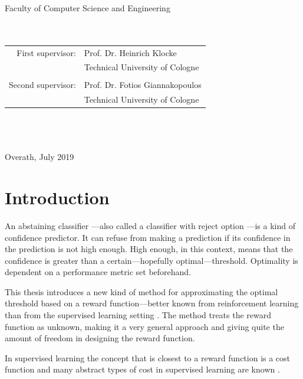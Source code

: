 \documentclass[twoside,11pt]{article}
\begin{document}
\begin{titlepage}
\begin{center}
\begin{large}
Faculty of Computer Science and Engineering
~\\
~\\
~\\
\begin{tabular}{rl}
  First supervisor: &Prof. Dr. Heinrich Klocke\\
                    &Technical University of Cologne\\
  &\\
  Second supervisor: &Prof. Dr. Fotios Giannakopoulos\\
                     &Technical University of Cologne
\end{tabular}
~\\
~\\
~\\
Overath, July 2019
\end{large}
\end{center}
\end{titlepage}



\section{Introduction}
\label{sec:intro}

An abstaining classifier
\citep[see e.g.][]{vanderlooy_et_al_2009}---also called a
classifier with reject option
\citep[see e.g.][]{fisher_et_al_2016}---is a kind
of confidence predictor.
It can refuse from making a prediction if its confidence in
the prediction is not high enough.
High enough, in this context, means that the confidence is
greater than a certain---hopefully optimal---threshold.
Optimality is dependent on a performance metric set
beforehand.

This thesis introduces a new kind of method for
approximating the optimal threshold based on a reward
function---better known from reinforcement learning than
from the supervised learning setting
\citep[see e.g.][Chapter 1]{sutton_et_al_2018}.
The method treats the reward function as unknown, making it
a very general approach and giving quite the amount of
freedom in designing the reward function.

In supervised learning the concept that is closest to a
reward function is a cost function and many abstract types
of cost in supervised learning are known
\citep[see][]{turney_2000}.
\end{document}
